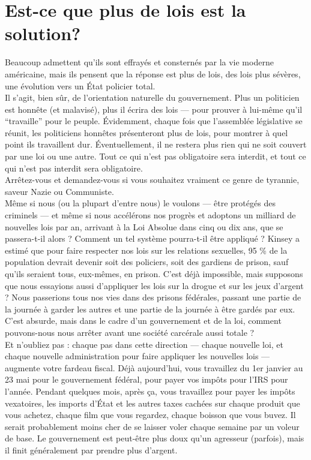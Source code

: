 \section*{Est-ce que plus de lois est la solution?}

Beaucoup admettent qu'ils sont effrayés et consternés par la vie moderne américaine, mais ils pensent que la réponse est plus de lois, des lois plus sévères, une évolution vers un État policier total.\\
Il s'agit, bien sûr, de l'orientation naturelle du gouvernement. Plus un politicien est honnête (et malavisé), plus il écrira des lois --- pour prouver à lui-même qu'il ``travaille'' pour le peuple. Évidemment, chaque fois que l'assemblée législative se réunit, les politiciens honnêtes présenteront plus de lois, pour montrer à quel point ils travaillent dur. Éventuellement, il ne restera plus rien qui ne soit couvert par une loi ou une autre. Tout ce qui n'est pas obligatoire sera interdit, et tout ce qui n'est pas interdit sera obligatoire.\\
Arrêtez-vous et demandez-vous si vous souhaitez vraiment ce genre de tyrannie, saveur Nazie ou Communiste.\\
Même si nous (ou la plupart d'entre nous) le voulons --- être protégés des criminels --- et même si nous accélérons nos progrès et adoptons un milliard de nouvelles lois par an, arrivant à la Loi Absolue dans cinq ou dix ans, que se passera-t-il alors ? Comment un tel système pourra-t-il être appliqué ? Kinsey a estimé que pour faire respecter nos lois sur les relations sexuelles, 95 \% de la population devrait devenir soit des policiers, soit des gardiens de prison, sauf qu'ils seraient tous, eux-mêmes, en prison. C'est déjà impossible, mais supposons que nous essayions aussi d'appliquer les lois sur la drogue et sur les jeux d'argent ? Nous passerions tous nos vies dans des prisons fédérales, passant une partie de la journée à garder les autres et une partie de la journée à être gardés par eux.\\
C'est absurde, mais dans le cadre d'un gouvernement et de la loi, comment pouvons-nous nous arrêter avant une société carcérale aussi totale ?\\
Et n'oubliez pas : chaque pas dans cette direction --- chaque nouvelle loi, et chaque nouvelle administration pour faire appliquer les nouvelles lois --- augmente votre fardeau fiscal. Déjà aujourd'hui, vous travaillez du 1er janvier au 23 mai pour le gouvernement fédéral, pour payer vos impôts pour l'IRS pour l'année. Pendant quelques mois, après ça, vous travaillez pour payer les impôts vexatoires, les imports d'État et les autres taxes cachées sur chaque produit que vous achetez, chaque film que vous regardez, chaque boisson que vous buvez. Il serait probablement moins cher de se laisser voler chaque semaine par un voleur de base. Le gouvernement est peut-être plus doux qu'un agresseur (parfois), mais il finit généralement par prendre plus d'argent.

